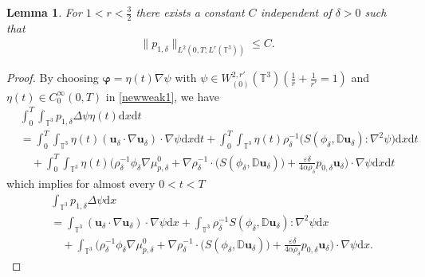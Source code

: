\documentclass[reqno,a4paper,11pt]{amsart}
\theoremstyle{plain}
\newtheorem{lemma}[theorem]{Lemma}
\numberwithin{equation}{section}
\renewcommand{\d}{\mathrm{d}}
\newcommand{\dx}{\d x}
\newcommand{\dt}{\d t}
\begin{document}
\begin{lemma}\label{lem5.1}
	For $1<r<\frac{3}{2}$  there exists a constant $C$ independent of $\delta > 0$ such that
	\begin{align*}
		\|p_{1,\delta}\|_{L^{2}(0,T;L^{r}(\mathbb{T}^{3}))}\leq C.
	\end{align*}
\end{lemma}
\begin{proof}
	By choosing $\boldsymbol{\varphi}=\eta(t)\nabla\psi$ with $\psi\in W_{(0)}^{2,r'}(\mathbb{T}^{3})(\frac{1}{r}+\frac{1}{r'}=1)$  and $\eta(t)\in C_{0}^{\infty}(0,T)$  in \eqref{newweak1}, we have
	\begin{align*}
		&\int_0^{T}\int_{\mathbb{T}^{3}} p_{1,\delta}\Delta\psi \eta(t) \dx\dt
		\\&=\int_0^{T}\int_{\mathbb{T}^{3}}\eta(t)(\mathbf{u}_{\delta}\cdot\nabla
		\mathbf{u}_{\delta})\cdot\nabla\psi  \dx\dt+\int_0^{T}\int_{\mathbb{T}^{3}}\eta(t)\rho_{\delta}^{-1}\big(S(\phi_{\delta},\mathbb{ D}\mathbf{u}_{\delta}):\nabla^{2}\psi\big)  \dx\dt
		\\&\quad+\int_0^{T}\int_{\mathbb{T}^{3}}\eta(t)\big(\rho_{\delta}^{-1}\phi_{\delta} \nabla \mu_{p,\delta}^{0}+\nabla\rho_{\delta}^{-1}\cdot\big(S(\phi_{\delta},\mathbb{ D}\mathbf{u}_{\delta})\big)+\frac{\varepsilon\delta}{4\alpha\rho_{\delta}}  p_{0,\delta} \mathbf{u}_{\delta}\big)\cdot\nabla\psi  \dx\dt
	\end{align*}
	which implies for almost every $0<t<T$
	\begin{align*}
		&\int_{\mathbb{T}^{3}} p_{1,\delta}\Delta\psi  \dx
		\\&=\int_{\mathbb{T}^{3}}(\mathbf{u}_{\delta}\cdot\nabla
		\mathbf{u}_{\delta})\cdot\nabla\psi  \dx+\int_{\mathbb{T}^{3}}\rho_{\delta}^{-1}S(\phi_{\delta},\mathbb{ D}\mathbf{u}_{\delta}):\nabla^{2}\psi  \dx
		\\&\quad+\int_{\mathbb{T}^{3}}\big(\rho_{\delta}^{-1}\phi_{\delta} \nabla \mu_{p,\delta}^{0}+\nabla\rho_{\delta}^{-1}\cdot\big(S(\phi_{\delta},\mathbb{ D}\mathbf{u}_{\delta})\big)+\frac{\varepsilon\delta}{4\alpha \rho_{\delta}}  p_{0,\delta} \mathbf{u}_{\delta}\big)\cdot\nabla\psi  \dx.
	\end{align*}
	

\end{proof}
\end{document}
